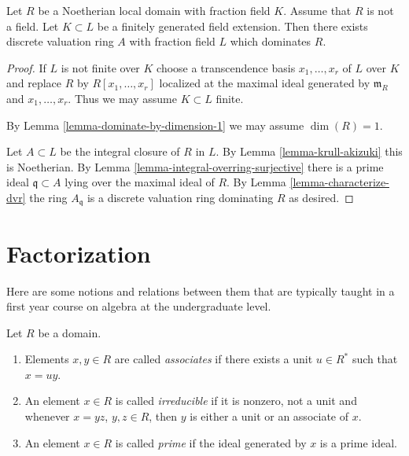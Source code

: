 \begin{lemma}
\label{lemma-exists-dvr}
Let $R$ be a Noetherian local domain with fraction field $K$.
Assume that $R$ is not a field.
Let $K \subset L$ be a finitely generated field extension.
Then there exists discrete valuation ring $A$ with fraction field
$L$ which dominates $R$.
\end{lemma}

\begin{proof}
If $L$ is not finite over $K$ choose a transcendence basis
$x_1, \ldots, x_r$ of $L$ over $K$ and replace $R$ by
$R[x_1, \ldots, x_r]$ localized at the maximal ideal
generated by $\mathfrak m_R$ and $x_1, \ldots, x_r$.
Thus we may assume $K \subset L$ finite.

\medskip\noindent
By Lemma \ref{lemma-dominate-by-dimension-1} we may assume $\dim(R) = 1$.

\medskip\noindent
Let $A \subset L$ be the integral closure of $R$ in $L$.
By Lemma \ref{lemma-krull-akizuki} this is Noetherian.
By Lemma \ref{lemma-integral-overring-surjective} there
is a prime ideal $\mathfrak q \subset A$ lying
over the maximal ideal of $R$.
By Lemma \ref{lemma-characterize-dvr} the ring $A_{\mathfrak q}$ is a discrete
valuation ring dominating $R$ as desired.
\end{proof}








\section{Factorization}
\label{section-factoring}

\noindent
Here are some notions and relations between them that are typically taught
in a first year course on algebra at the undergraduate level.

\begin{definition}
\label{definition-irreducible-prime-element}
Let $R$ be a domain.
\begin{enumerate}
\item Elements $x, y \in R$ are called {\it associates} if
there exists a unit $u \in R^*$ such that $x = uy$.
\item An element $x \in R$ is called {\it irreducible}
if it is nonzero, not a unit and whenever $x = yz$, $y, z \in R$,
then $y$ is either a unit or an associate of $x$.
\item An element $x \in R$ is called {\it prime} if the ideal
generated by $x$ is a prime ideal.
\end{enumerate}
\end{definition}


